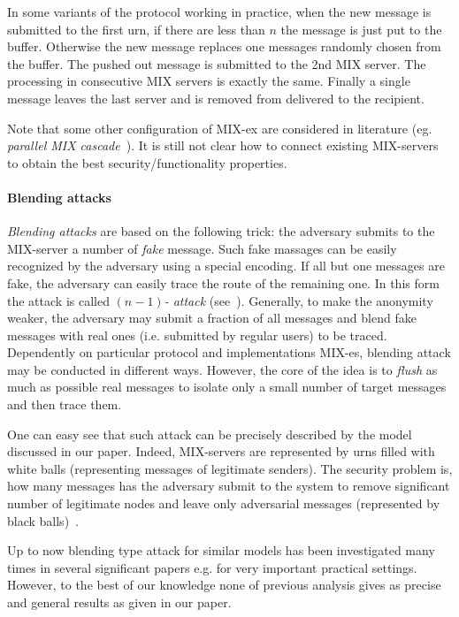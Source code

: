 \documentclass[submission]{dmtcs}
\begin{document}
In some variants of the protocol working in practice,  when the new message is submitted to the first urn, if there are less than $n$
the message is just put to the buffer. Otherwise the new message replaces one messages randomly chosen from the buffer. The pushed out message is submitted to the 2nd MIX server. The processing in consecutive MIX servers is exactly the same. Finally a single message leaves the last server and is removed from delivered to the recipient.  


Note that some other configuration of MIX-ex are considered in literature (eg. \textit{parallel MIX cascade}~\cite{PMCmy,PMConi}). It is still not clear how to connect existing MIX-servers to obtain the best security/functionality properties.  



\paragraph{Blending attacks} \textit{Blending attacks} are based on the following trick: the adversary submits to the MIX-server a number of \textit{fake} message. Such fake massages can be easily recognized  by the adversary using a special encoding.  If all but one messages are fake, the adversary can easily trace the route of the remaining one. In this form the attack is called \textit{$(n-1)$- attack} (see~\cite{DOGAN}). Generally, to make the anonymity weaker, the adversary may submit a fraction of all messages and blend fake messages with real ones (i.e. submitted by regular users) to be traced.  
Dependently on particular protocol and implementations MIX-es, blending attack may be conducted in different ways. However, the core of the idea is to \textit{flush} as much as possible real messages to isolate only a small number of target messages and then trace them. 

\medskip

One can easy see that such  attack can be precisely described by the model discussed in our paper. Indeed, MIX-servers are represented by urns filled with white balls (representing messages of legitimate senders). The security problem is, how many messages has the adversary submit to the system to remove significant number of legitimate nodes and leave only adversarial messages (represented by black balls)~.

Up to now blending type attack for similar models has been investigated many times in several significant papers e.g. \cite{IH05,tic,lat} for very important practical settings. However, to the best of our knowledge none of previous analysis gives as precise and general  results as given in our paper.
\end{document}
